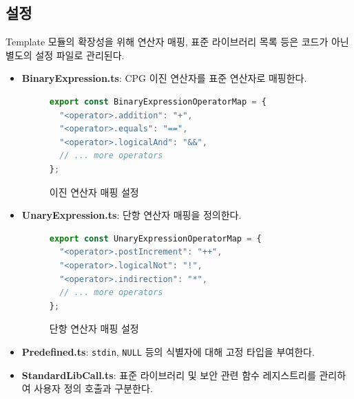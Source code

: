\subsection{설정}
Template 모듈의 확장성을 위해 연산자 매핑, 표준 라이브러리 목록 등은 코드가 아닌 별도의 설정 파일로 관리된다.

\begin{itemize}
    \item \textbf{BinaryExpression.ts}: CPG 이진 연산자를 표준 연산자로 매핑한다.
    \begin{figure}[H]
        \centering
        \begin{lstlisting}[language=TypeScript]
export const BinaryExpressionOperatorMap = {
  "<operator>.addition": "+",
  "<operator>.equals": "==",
  "<operator>.logicalAnd": "&&",
  // ... more operators
};
        \end{lstlisting}
        \caption{이진 연산자 매핑 설정}
        \label{fig:binary_map}
    \end{figure}
    
    \item \textbf{UnaryExpression.ts}: 단항 연산자 매핑을 정의한다.
    \begin{figure}[H]
        \centering
        \begin{lstlisting}[language=TypeScript]
export const UnaryExpressionOperatorMap = {
  "<operator>.postIncrement": "++",
  "<operator>.logicalNot": "!",
  "<operator>.indirection": "*",
  // ... more operators
};
        \end{lstlisting}
        \caption{단항 연산자 매핑 설정}
        \label{fig:unary_map}
    \end{figure}
    
    \item \textbf{Predefined.ts}: \texttt{stdin}, \texttt{NULL} 등의 식별자에 대해 고정 타입을 부여한다.
    \item \textbf{StandardLibCall.ts}: 표준 라이브러리 및 보안 관련 함수 레지스트리를 관리하여 사용자 정의 호출과 구분한다.
\end{itemize}